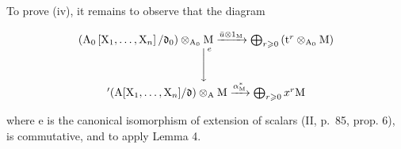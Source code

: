 To prove (iv), it remains to observe that the diagram

\[
\begin{array}{c} \left(\mathrm{A} _ {0} \left[ \mathrm{X} _ {1}, \dots , \mathrm{X} _ {n} \right] / \mathfrak {d} _ {0}\right) \otimes_ {\mathrm{A} _ {0}} \mathrm{M} \xrightarrow {\bar {u} \otimes 1 _ {\mathrm{M}}} \bigoplus_ {r \geqslant 0} \left(\mathrm{t} ^ {r} \otimes_ {\mathrm{A} _ {0}} \mathrm{M}\right) \\ \Bigg \downarrow^ {e} \\ ^ {\prime} (\mathrm{A} [ \mathrm{X} _ {1}, \dots , \mathrm{X} _ {n} ] / \mathfrak {d}) \otimes_ {\mathrm{A}} \mathrm{M} \xrightarrow {\alpha_ {\mathrm{M}} ^ {*}} \bigoplus_ {r \geqslant 0} x ^ {r} \mathrm{M} \end{array}
\]

where e is the canonical isomorphism of extension of scalars (II, p.~85, prop. 6), is commutative, and to apply Lemma 4.

